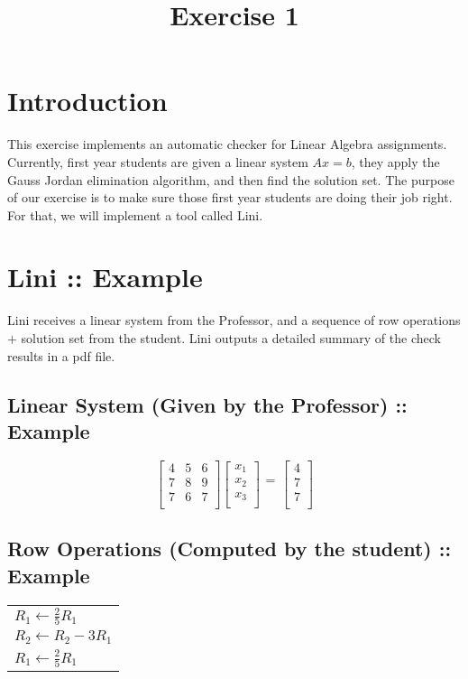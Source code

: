 \documentclass{article}
\begin{document}
\title{Exercise 1}
\maketitle

\section{Introduction}
This exercise implements an automatic checker for Linear Algebra assignments.
Currently, first year students are given a linear system $Ax=b$,
they apply the Gauss Jordan elimination algorithm, and then find the solution set.
The purpose of our exercise is to make sure those first year students
are doing their job right. For that, we will implement a tool called Lini.

\section{Lini :: Example}
Lini receives a linear system from the Professor,
and a sequence of row operations $+$ solution set from the student.
Lini outputs a detailed summary of the check results in a pdf file.

\subsection*{Linear System (Given by the Professor) :: Example}
\[
\left[
\begin{array}{ccc}
4	&	5	&	6\\
7	&	8	&	9\\
7	&	6	&	7\\
\end{array}
\right]
\left[
\begin{array}{c}
x_{1}\\
x_{2}\\
x_{3}\\
\end{array}
\right]
\begin{array}{c}
 \\
=\\
 \\
\end{array}
\left[
\begin{array}{c}
4\\
7\\
7\\
\end{array}
\right]
\]
\subsection*{Row Operations (Computed by the student) :: Example}
\begin{table}[h]
\centering
\begin{tabular}{ l }
  $R_{1} \leftarrow \frac{2}{5}R_{1}$ \\
  $R_{2} \leftarrow R_{2} - 3R_{1}$ \\
  $R_{1} \leftarrow \frac{2}{5}R_{1}$
\end{tabular}
\end{table}
\end{document}
